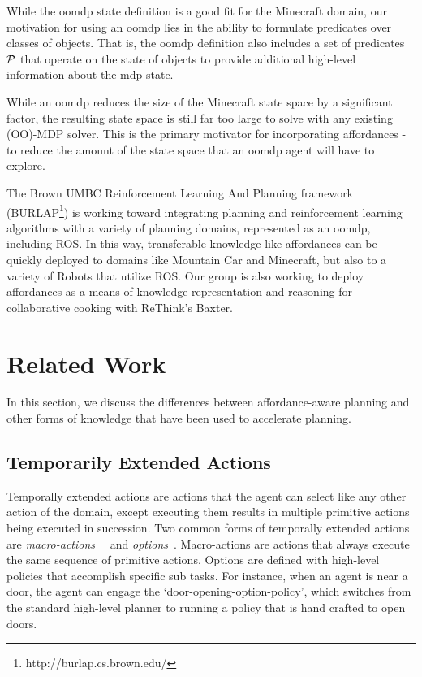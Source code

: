 \documentclass[letterpaper]{article}
\begin{document}
While the \gls{oomdp} state definition is a good fit for the Minecraft
domain, our motivation for using an \gls{oomdp} lies in the ability to
formulate predicates over classes of objects. That is, the \gls{oomdp}
definition also includes a set of predicates ${\cal P}$ that operate
on the state of objects to provide additional high-level information
about the \gls{mdp} state. 

While an \gls{oomdp} reduces the size of the Minecraft state space
by a significant factor, the resulting state space is still far too large to
solve with any existing (OO)-MDP solver. This is the primary motivator
for incorporating affordances - to reduce the amount of the
state space that an \gls{oomdp} agent will have to explore.

The Brown UMBC Reinforcement Learning And Planning framework (BURLAP\footnote{http://burlap.cs.brown.edu/})
is working toward integrating planning and reinforcement learning algorithms with a variety of planning domains, represented
as an \gls{oomdp}, including ROS. In this way, transferable knowledge like affordances can be quickly deployed
to domains like Mountain Car \cite{Moore90efficientmemory-based} and Minecraft, but also to a variety
of Robots that utilize ROS. Our group is also working to deploy affordances as a
means of knowledge representation and reasoning for collaborative cooking with ReThink's Baxter.

\section{Related Work}
\label{sec:related-work}
In this section, we discuss the differences between
affordance-aware planning and other forms of knowledge that
have been used to accelerate planning.

\subsection{Temporarily Extended Actions}
Temporally extended actions are actions that the agent can
select like any other action of the domain, except executing them
results in multiple primitive actions being executed in
succession. Two common forms of temporally extended actions are {\em
  macro-actions}~\cite{hauskrecht98} ~and {\em options}~\cite{sutton99}. 
Macro-actions are actions that always
execute the same sequence of primitive actions. Options are defined
with high-level policies that accomplish specific sub tasks. For
instance, when an agent is near a door, the agent can engage the
`door-opening-option-policy', which switches from the standard
high-level planner to running a policy that is hand crafted to open
doors. 
\end{document}
